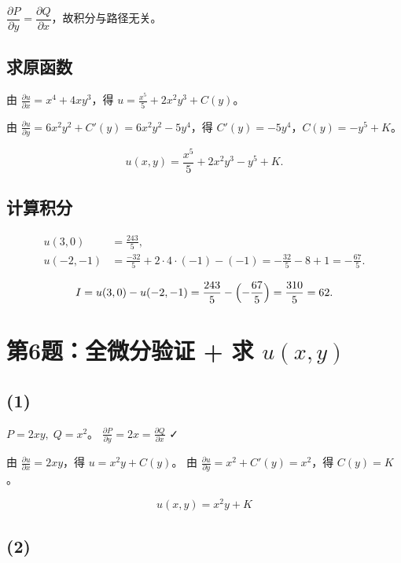 \documentclass[12pt,a4paper]{ctexart}
\newcommand{\answerbox}[1]{%
  \begin{center}\fbox{\color{red}\large\bfseries #1}\end{center}}
\begin{document}
$\dfrac{\partial P}{\partial y}=\dfrac{\partial Q}{\partial x}$，故积分与路径无关。

\subsection*{求原函数}

由 $\frac{\partial u}{\partial x}=x^4+4xy^3$，得 $u=\frac{x^5}{5}+2x^2y^3+C(y)$。

由 $\frac{\partial u}{\partial y}=6x^2y^2+C'(y)=6x^2y^2-5y^4$，得 $C'(y)=-5y^4$，$C(y)=-y^5+K$。

\[
u(x,y)=\frac{x^5}{5}+2x^2y^3-y^5+K.
\]

\subsection*{计算积分}

\[
\begin{aligned}
u(3,0) &= \frac{243}{5}, \\[4pt]
u(-2,-1) &= \frac{-32}{5}+2\cdot4\cdot(-1)-(-1)
          = -\frac{32}{5}-8+1 = -\frac{67}{5}.
\end{aligned}
\]

\[
I = u(3,0)-u(-2,-1) = \frac{243}{5}-\Bigl(-\frac{67}{5}\Bigr)
   = \frac{310}{5} = 62.
\]

\answerbox{$I = 62$}

\section{第6题：全微分验证 + 求 $u(x,y)$}


\subsection*{(1)}

$P=2xy,\;Q=x^2$。
$\frac{\partial P}{\partial y}=2x=\frac{\partial Q}{\partial x}$ ✓

由 $\frac{\partial u}{\partial x}=2xy$，得 $u=x^2y+C(y)$。
由 $\frac{\partial u}{\partial y}=x^2+C'(y)=x^2$，得 $C(y)=K$。

\[
\boxed{u(x,y)=x^2y+K}
\]

\subsection*{(2)}
\end{document}

